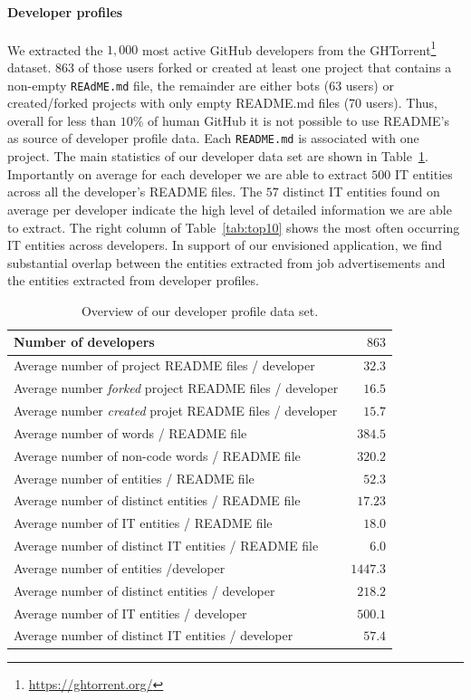 \documentclass[conference]{IEEEtran}
\begin{document}
\paragraph{Developer profiles}

We extracted the $1,000$ most active GitHub developers from the GHTorrent\footnote{\url{https://ghtorrent.org/}} dataset. 863 of those users forked or created at least one project that contains a non-empty \texttt{REAdME.md} file, the remainder are either bots (63 users) or created/forked projects with only empty README.md files (70 users). Thus, overall for less than $10\%$ of human GitHub it is not possible to use README's as source of developer profile data. Each \texttt{README.md} is associated with one project. The main statistics of our developer data set are shown in Table~\ref{tab:developers}. Importantly on average for each developer we are able to extract $500$ IT entities across all the developer's README files. The $57$ distinct IT entities found on average per developer indicate the high level of detailed information we are able to extract. The right column of Table~\ref{tab:top10} shows the most often occurring IT entities across developers. In support of our envisioned application, we find substantial overlap between the entities extracted from job advertisements and the entities extracted from developer profiles.


\begin{table}[htb]
\centering
\begin{tabular}{lr}
\toprule
Number of developers									& $863$\\
\midrule
Average number of project README files / developer	& $32.3$\\
Average number \emph{forked} project README files / developer	& $16.5$\\
Average number \emph{created} projet README files / developer & $15.7$\\
\midrule
Average number of words / README file		& $384.5$\\
Average number of non-code words / README file 	& $320.2$\\
\midrule
Average number of entities / README file 					& $52.3$\\
Average number of distinct entities / README file 					& $17.23$\\
\midrule
Average number of IT entities / README file				& $18.0$\\
Average number of distinct IT entities / README file				& $6.0$\\
\midrule
Average number of entities /developer						& $1447.3$\\
Average number of distinct entities / developer			& $218.2$\\
Average number of IT entities / developer			& $500.1$\\
Average number of distinct IT entities / developer		& $57.4$\\
\bottomrule
\end{tabular}
\caption{Overview of our developer profile data set.}
\label{tab:developers}
\end{table}
\end{document}
